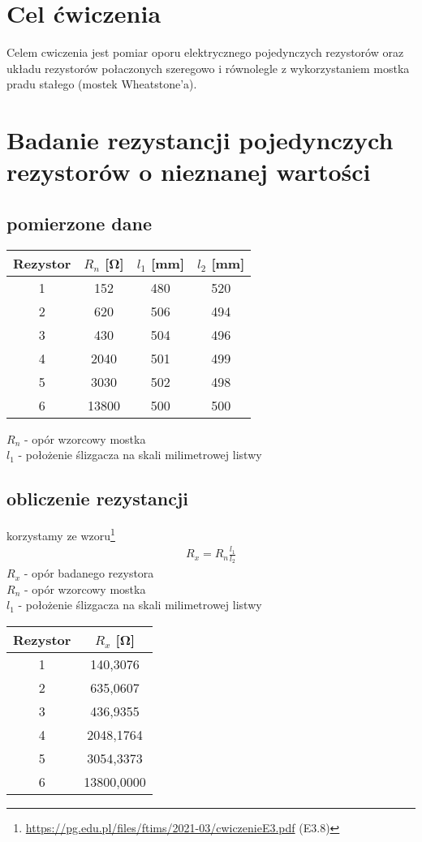 \documentclass{article}
\begin{document}
\section{Cel ćwiczenia}
Celem cwiczenia jest pomiar oporu elektrycznego pojedynczych rezystorów
oraz układu rezystorów połaczonych szeregowo i równolegle z wykorzystaniem
mostka pradu stałego (mostek Wheatstone’a).

\section{Badanie rezystancji pojedynczych rezystorów o nieznanej wartości}
\subsection{pomierzone dane}
\begin{center}
\begin{tabular}{ c | c | c | c}
Rezystor & $R_n$ [\si{\ohm}] & $l_1$ [mm] & $l_2$ [mm]\\
\hline
 1    & 152 & 480 & 520\\ 
 2    & 620 & 506 & 494\\ 
 3  & 430 & 504 & 496\\ 
 4  & 2040 & 501 & 499\\
 5   & 3030 & 502 & 498\\
 6  & 13800 & 500 & 500\\
 
\end{tabular}
\end{center}
$R_n$ - opór wzorcowy mostka\\ 
$l_1$ - położenie ślizgacza na skali milimetrowej listwy\\

\subsection{obliczenie rezystancji}
korzystamy ze wzoru\footnote{\url{https://pg.edu.pl/files/ftims/2021-03/cwiczenieE3.pdf} (E3.8)}
\begin{gather*}
	R_x = R_n\frac{l_1}{l_2}
\end{gather*} 
$R_x$ - opór badanego rezystora\\ 
$R_n$ - opór wzorcowy mostka\\ 
$l_1$ - położenie ślizgacza na skali milimetrowej listwy\\

\begin{center}
\begin{tabular}{ c | c }
Rezystor & $R_x$ [\si{\ohm}]\\
\hline
 1    & 140,3076 \\ 
 2    & 635,0607\\ 
 3  & 436,9355 \\ 
 4  & 2048,1764 \\
 5   & 3054,3373\\
 6  & 13800,0000 \\
 
\end{tabular}
\end{center}
\end{document}
